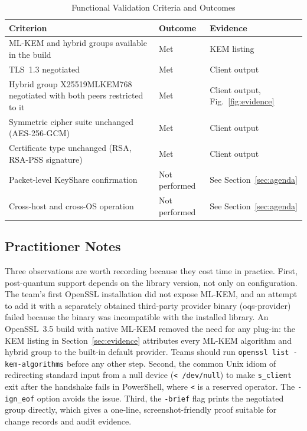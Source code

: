 \documentclass[conference]{IEEEtran}
\begin{document}
\begin{table}[t]
\centering
\caption{Functional Validation Criteria and Outcomes}
\label{tab:results}
\footnotesize
\begin{tabular}{@{}>{\raggedright\arraybackslash}p{}>{\raggedright\arraybackslash}p{}>{\raggedright\arraybackslash}p{}@{}}
\toprule
Criterion & Outcome & Evidence \\
\midrule
ML-KEM and hybrid groups available in the build & Met & KEM listing \\
TLS~1.3 negotiated & Met & Client output \\
Hybrid group X25519MLKEM768 negotiated with both peers restricted to it & Met & Client output, Fig.~\ref{fig:evidence} \\
Symmetric cipher suite unchanged (AES-256-GCM) & Met & Client output \\
Certificate type unchanged (RSA, RSA-PSS signature) & Met & Client output \\
Packet-level KeyShare confirmation & Not performed & See Section~\ref{sec:agenda} \\
Cross-host and cross-OS operation & Not performed & See Section~\ref{sec:agenda} \\
\bottomrule
\end{tabular}
\end{table}

\subsection{Practitioner Notes}
Three observations are worth recording because they cost time in practice. First, post-quantum support depends on the library version, not only on configuration. The team's first OpenSSL installation did not expose ML-KEM, and an attempt to add it with a separately obtained third-party provider binary (oqs-provider) failed because the binary was incompatible with the installed library. An OpenSSL~3.5 build with native ML-KEM removed the need for any plug-in: the KEM listing in Section~\ref{sec:evidence} attributes every ML-KEM algorithm and hybrid group to the built-in default provider. Teams should run \texttt{openssl list -kem-algorithms} before any other step. Second, the common Unix idiom of redirecting standard input from a null device (\texttt{< /dev/null}) to make \texttt{s\_client} exit after the handshake fails in PowerShell, where \texttt{<} is a reserved operator. The \texttt{-ign\_eof} option avoids the issue. Third, the \texttt{-brief} flag prints the negotiated group directly, which gives a one-line, screenshot-friendly proof suitable for change records and audit evidence.
\end{document}
